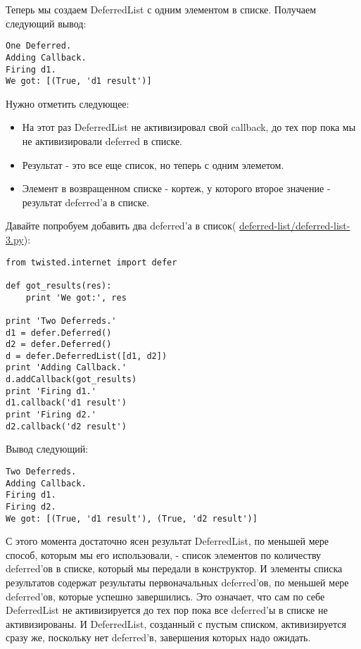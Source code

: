Теперь мы создаем DeferredList с одним элементом в 
списке. Получаем следующий вывод:

 \begin{verbatim}
One Deferred.
Adding Callback.
Firing d1.
We got: [(True, 'd1 result')]
\end{verbatim} 

Нужно отметить следующее:

\begin{itemize}

\item На этот раз DeferredList не активизировал свой callback, 
    до тех пор пока мы не активизировали deferred в списке.

\item Результат - это все еще список, но теперь с одним элеметом.

\item Элемент в возвращенном списке - кортеж, у которого второе значение - 
    результат deferred'а в списке.

\end{itemize}

Давайте попробуем добавить два deferred'а в список(
\href{http://github.com/jdavisp3/twisted-intro/blob/master/deferred-list/deferred-list-1.py#L3}{deferred-list/deferred-list-3.py}):

 \begin{verbatim}
from twisted.internet import defer

def got_results(res):
    print 'We got:', res

print 'Two Deferreds.'
d1 = defer.Deferred()
d2 = defer.Deferred()
d = defer.DeferredList([d1, d2])
print 'Adding Callback.'
d.addCallback(got_results)
print 'Firing d1.'
d1.callback('d1 result')
print 'Firing d2.'
d2.callback('d2 result')
\end{verbatim} 

Вывод следующий:

 \begin{verbatim}
Two Deferreds.
Adding Callback.
Firing d1.
Firing d2.
We got: [(True, 'd1 result'), (True, 'd2 result')]
\end{verbatim} 


С этого момента достаточно ясен результат DeferredList, 
по меньшей мере способ, которым мы его использовали, - 
список элементов по количеству deferred'ов в списке, 
который мы передали в конструктор. И элементы списка 
результатов содержат результаты первоначальных deferred'ов, 
по меньшей мере deferred'ов, которые успешно завершились. 
Это означает, что сам по себе DeferredList не активизируется 
до тех пор пока все deferred'ы в списке не активизированы. И 
DeferredList, созданный с пустым списком, активизируется 
сразу же, поскольку нет deferred'в, завершения которых 
надо ожидать.


